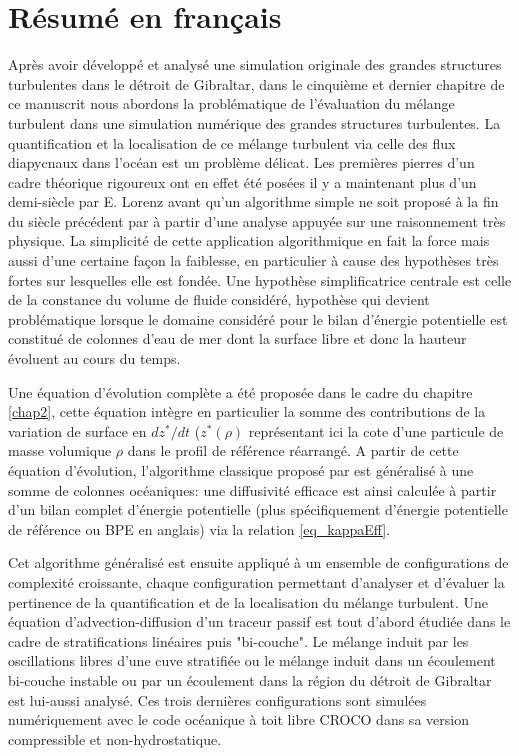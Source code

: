 \section{Résumé en français}
Après avoir développé et analysé une simulation originale des grandes structures turbulentes dans le détroit de Gibraltar, dans le cinquième et dernier chapitre de ce manuscrit nous abordons la problématique de l'évaluation du mélange turbulent dans une simulation numérique des grandes structures turbulentes. La quantification et la localisation de ce mélange turbulent via celle des flux diapycnaux dans l'océan est un problème délicat. Les premières pierres d'un cadre théorique rigoureux ont en effet été posées il y a maintenant plus d'un demi-siècle par E. Lorenz \citep{lorenz_available_1955} avant qu'un algorithme simple ne soit proposé à la fin du siècle précédent par \cite{winters_available_1995} à partir d'une analyse appuyée sur une raisonnement très physique. La simplicité de cette application algorithmique en fait la force mais aussi d'une certaine façon la faiblesse, en particulier à cause des hypothèses très fortes sur lesquelles elle est fondée. Une hypothèse simplificatrice centrale est celle de la constance du volume de fluide considéré, hypothèse qui devient problématique lorsque le domaine considéré pour le bilan d'énergie potentielle est constitué de colonnes d'eau de mer dont la surface libre et donc la hauteur évoluent au cours du temps.

Une équation d'évolution complète a été proposée dans le cadre du chapitre \ref{chap2}, cette équation intègre en particulier la somme des contributions de la variation de surface en $dz^*/dt$ ($z^*(\rho)$ représentant ici la cote d'une particule de masse volumique $\rho$ dans le profil de référence réarrangé. A partir de cette équation d'évolution, l'algorithme classique proposé par \cite{winters_available_1995} est généralisé à une somme de colonnes océaniques: une diffusivité efficace est ainsi calculée à partir d'un bilan complet d'énergie potentielle (plus spécifiquement d'énergie potentielle de référence ou BPE en anglais) via la relation \ref{eq_kappaEff}.

Cet algorithme généralisé est ensuite appliqué à un ensemble de configurations de complexité croissante, chaque configuration permettant d'analyser et d'évaluer la pertinence de la quantification et de la localisation du mélange turbulent. Une équation d'advection-diffusion d'un traceur passif est tout d'abord étudiée dans le cadre de stratifications linéaires puis "bi-couche". Le mélange induit par les oscillations libres d'une cuve stratifiée ou le mélange induit dans un écoulement bi-couche instable ou par un écoulement dans la région du détroit de Gibraltar est lui-aussi analysé. Ces trois dernières configurations sont simulées numériquement avec le code océanique à toit libre CROCO dans sa version compressible et non-hydrostatique.

